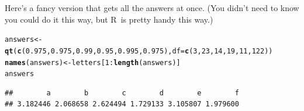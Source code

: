 \documentclass[twoside]{book}\usepackage[]{graphicx}\usepackage[]{xcolor}
\makeatletter
\newcommand{\hlnum}[1]{\textcolor[rgb]{0.686,0.059,0.569}{#1}}%
\newcommand{\hlopt}[1]{\textcolor[rgb]{0,0,0}{#1}}%
\newcommand{\hlstd}[1]{\textcolor[rgb]{0.345,0.345,0.345}{#1}}%
\newcommand{\hlkwb}[1]{\textcolor[rgb]{0.69,0.353,0.396}{#1}}%
\newcommand{\hlkwc}[1]{\textcolor[rgb]{0.333,0.667,0.333}{#1}}%
\newcommand{\hlkwd}[1]{\textcolor[rgb]{0.737,0.353,0.396}{\textbf{#1}}}%
\newenvironment{kframe}{%
 \def\at@end@of@kframe{}%
 \ifinner\ifhmode%
  \def\at@end@of@kframe{\end{minipage}}%
  \begin{minipage}{\columnwidth}%
 \fi\fi%
 \def\FrameCommand##1{\hskip\@totalleftmargin \hskip-\fboxsep
 \colorbox{shadecolor}{##1}\hskip-\fboxsep
     \hskip-\linewidth \hskip-\@totalleftmargin \hskip\columnwidth}%
 \MakeFramed {\advance\hsize-\width
   \@totalleftmargin\z@ \linewidth\hsize
   \@setminipage}}%
 {\par\unskip\endMakeFramed%
 \at@end@of@kframe}
\newenvironment{knitrout}{}{} %
\def\R{{\sf R}}
\makeatother
\begin{document}
\begin{solution}
Here's a fancy version that gets all the answers at once.  (You didn't need to know
you could do it this way, but \R\ is pretty handy this way.)
\begin{knitrout}
\color{fgcolor}\begin{kframe}
\begin{alltt}
\hlstd{answers} \hlkwb{<-} \hlkwd{qt}\hlstd{(}\hlkwd{c}\hlstd{(}\hlnum{0.975}\hlstd{,} \hlnum{0.975}\hlstd{,} \hlnum{0.99}\hlstd{,} \hlnum{0.95}\hlstd{,} \hlnum{0.995}\hlstd{,} \hlnum{0.975}\hlstd{),} \hlkwc{df} \hlstd{=} \hlkwd{c}\hlstd{(}\hlnum{3}\hlstd{,} \hlnum{23}\hlstd{,} \hlnum{14}\hlstd{,} \hlnum{19}\hlstd{,} \hlnum{11}\hlstd{,} \hlnum{122}\hlstd{))}
\hlkwd{names}\hlstd{(answers)} \hlkwb{<-} \hlstd{letters[}\hlnum{1}\hlopt{:}\hlkwd{length}\hlstd{(answers)]}
\hlstd{answers}
\end{alltt}
\begin{verbatim}
##        a        b        c        d        e        f 
## 3.182446 2.068658 2.624494 1.729133 3.105807 1.979600
\end{verbatim}
\end{kframe}
\end{knitrout}
\end{solution}
\end{document}

